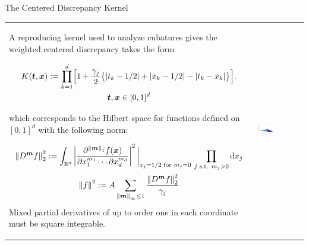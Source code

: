 \documentclass[10pt,compress,xcolor={usenames,dvipsnames},aspectratio=169]{beamer}
\begin{document}
\begin{frame}{The Centered Discrepancy Kernel \cite{Hic97a}}
	\vspace{-2ex}
	\begin{tabular}{m{}m{}}
		A reproducing kernel used to analyze cubatures gives the weighted centered discrepancy takes the form
		
		\vspace{-4ex}
		\begin{multline*}
			K(\vt,\vx) : = \prod_{k=1}^d \Bigl[ 1 + \frac {\gamma_j}2 \bigl\{ \abs{t_k - 1/2} + \abs{x_k -1/2} - \abs{t_k-x_k} \bigr\} \Bigr]. \\
			\vt, \vx \in [0,1]^d
		\end{multline*}
		
		\vspace{-2ex}
		which corresponds to the Hilbert space for functions defined on $[0,1]^d$ with the following norm:
		
		\vspace{-4ex}
		\begin{gather*}
			\norm[2]{D^{\vm} f}^2 := \int_{\reals^d} \abs{\frac{\partial^{\norm[1]{\vm}}f(\vx)}{\partial x_1^{m_1} \cdots \partial x_d^{m_d}}}^2 \bigg \rvert_{x_j = 1/2 \text{ for } m_j = 0} \, \prod_{j \text{ s.t. } m_j > 0} \dif x_j  \\
			\norm{f}^2 : = A \sum_{\norm[\infty]{\vm} \le 1} \frac{\norm[2]{D^{\vm} f}^2}{\gamma_j}
		\end{gather*}
		Mixed partial derivatives of up to order one in each coordinate must be square integrable.
		&
		\includegraphics[width=0.38\textwidth]{RK2-ctrdiscker.eps}
	\end{tabular}
\end{frame}
\end{document}
